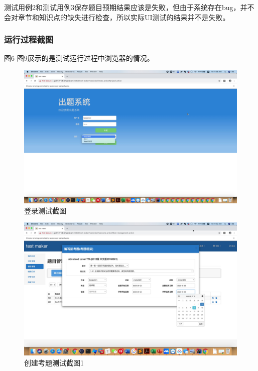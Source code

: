 \documentclass[hyperref, a4paper]{ctexart}
\begin{document}
测试用例2和测试用例3保存题目预期结果应该是失败，但由于系统存在bug，并不会对章节和知识点的缺失进行检查，所以实际UI测试的结果并不是失败。

\pagebreak

\hypertarget{ux8fd0ux884cux8fc7ux7a0bux622aux56fe}{%
\subsubsection{运行过程截图}\label{ux8fd0ux884cux8fc7ux7a0bux622aux56fe}}

图6-图9展示的是测试运行过程中浏览器的情况。

\begin{figure}
  \centering
  \includegraphics[scale=0.1]{./screenshots/login.jpg}
  \caption{登录测试截图}\label{6}
\end{figure}

\begin{figure}
  \centering
  \includegraphics[scale=0.1]{./screenshots/CreateQ1.jpg}
  \caption{创建考题测试截图1}\label{7}
\end{figure}
\end{document}
